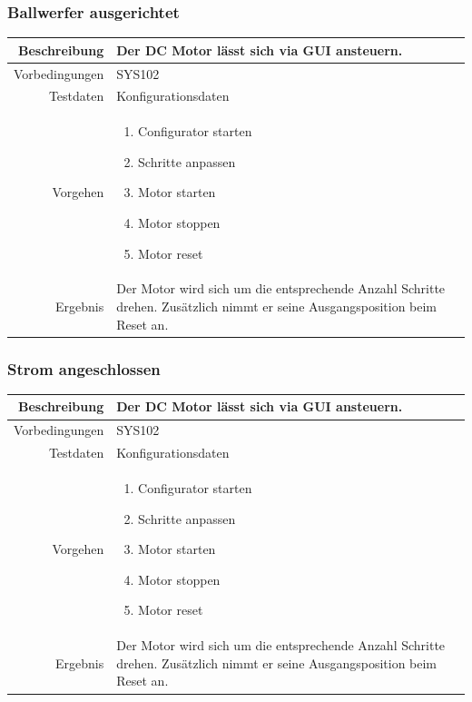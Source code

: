 \subsubsection{Ballwerfer ausgerichtet}
\begin{table}[h!]
	\renewcommand{\arraystretch}{1.5}
	\begin{tabular}{|r|p{14cm}|}
		\hline Beschreibung & Der DC Motor lässt sich via GUI ansteuern. \\ 
		\hline Vorbedingungen & SYS102 \\ 
		\hline Testdaten & Konfigurationsdaten \\ 
		\hline Vorgehen & 
		\begin{enumerate}
			\item Configurator starten
			\item Schritte anpassen
			\item Motor starten
			\item Motor stoppen
			\item Motor reset
		\end{enumerate} \\ 
		\hline Ergebnis & Der Motor wird sich um die entsprechende Anzahl Schritte drehen. Zusätzlich nimmt er seine Ausgangsposition beim Reset an. \\ 
		\hline 
	\end{tabular}
\end{table}

\subsubsection{Strom angeschlossen}
\begin{table}[h!]
	\renewcommand{\arraystretch}{1.5}
	\begin{tabular}{|r|p{14cm}|}
		\hline Beschreibung & Der DC Motor lässt sich via GUI ansteuern. \\ 
		\hline Vorbedingungen & SYS102 \\ 
		\hline Testdaten & Konfigurationsdaten \\ 
		\hline Vorgehen & 
		\begin{enumerate}
			\item Configurator starten
			\item Schritte anpassen
			\item Motor starten
			\item Motor stoppen
			\item Motor reset
		\end{enumerate} \\ 
		\hline Ergebnis & Der Motor wird sich um die entsprechende Anzahl Schritte drehen. Zusätzlich nimmt er seine Ausgangsposition beim Reset an. \\ 
		\hline 
	\end{tabular}
\end{table}

